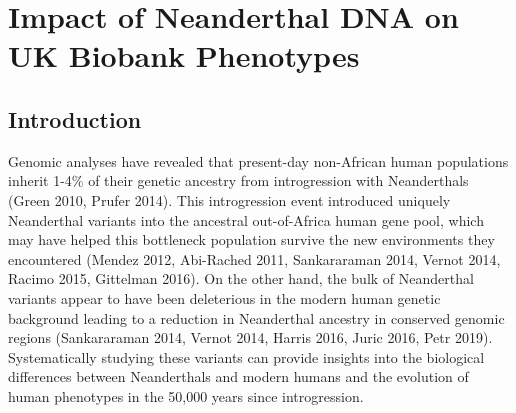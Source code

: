 \chapter{Impact of Neanderthal DNA on UK Biobank Phenotypes}
\section{Introduction}
Genomic analyses have revealed that present-day non-African human populations inherit 1-4\% of their genetic ancestry from introgression with Neanderthals (Green 2010, Prufer 2014). This introgression event introduced uniquely Neanderthal variants into the ancestral out-of-Africa human gene pool, which may have helped this bottleneck population survive the new environments they encountered (Mendez 2012, Abi-Rached 2011, Sankararaman 2014, Vernot 2014, Racimo 2015, Gittelman 2016). On the other hand, the bulk of Neanderthal variants appear to have been deleterious in the modern human genetic background leading to a reduction in Neanderthal ancestry in conserved genomic regions (Sankararaman 2014, Vernot 2014, Harris 2016, Juric 2016, Petr 2019). Systematically studying these variants can provide insights into the biological differences between Neanderthals and modern humans and the evolution of human phenotypes in the 50,000 years since introgression. 

